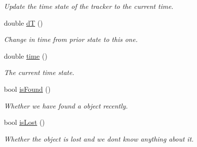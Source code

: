 \begin{DoxyCompactItemize}
\begin{DoxyCompactList}\small\item\em Update the time state of the tracker to the current time. \end{DoxyCompactList}\item 
double \hyperlink{classTrackingFilter_a3902e37f8e8698cc4b8ad4105dc3de5f}{dT} ()\hypertarget{classTrackingFilter_a3902e37f8e8698cc4b8ad4105dc3de5f}{}\label{classTrackingFilter_a3902e37f8e8698cc4b8ad4105dc3de5f}

\begin{DoxyCompactList}\small\item\em Change in time from prior state to this one. \end{DoxyCompactList}\item 
double \hyperlink{classTrackingFilter_a5c0b07589ba5cb9ac89320aba61526e5}{time} ()\hypertarget{classTrackingFilter_a5c0b07589ba5cb9ac89320aba61526e5}{}\label{classTrackingFilter_a5c0b07589ba5cb9ac89320aba61526e5}

\begin{DoxyCompactList}\small\item\em The current time state. \end{DoxyCompactList}\item 
bool \hyperlink{classTrackingFilter_adc38f62892d65e6b08b6f520f5a7df89}{is\+Found} ()\hypertarget{classTrackingFilter_adc38f62892d65e6b08b6f520f5a7df89}{}\label{classTrackingFilter_adc38f62892d65e6b08b6f520f5a7df89}

\begin{DoxyCompactList}\small\item\em Whether we have found a object recently. \end{DoxyCompactList}\item 
bool \hyperlink{classTrackingFilter_a500b877bcc60b5f7ea669e3b19322533}{is\+Lost} ()\hypertarget{classTrackingFilter_a500b877bcc60b5f7ea669e3b19322533}{}\label{classTrackingFilter_a500b877bcc60b5f7ea669e3b19322533}

\begin{DoxyCompactList}\small\item\em Whether the object is lost and we don\textquotesingle{}t know anything about it. \end{DoxyCompactList}\end{DoxyCompactItemize}
